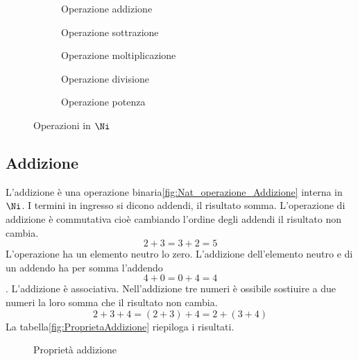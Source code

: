 \begin{figure} 
\begin{subfigure}[b]{.5\linewidth}
		\centering

	\caption{Operazione addizione}
	\label{fig:Nat_operazione_Addizione}
\end{subfigure}%
\begin{subfigure}[b]{.5\linewidth}
	\centering

	\caption{Operazione sottrazione}
	\label{fig:Nat_operazione_Sottrazione}
\end{subfigure}
	\begin{subfigure}[b]{.5\linewidth}
	\centering

	\caption{Operazione moltiplicazione}
	\label{fig:Nat_operazione_Moltiplicazione}
	\end{subfigure}
	\begin{subfigure}[b]{.5\linewidth}
	\centering

	\caption{Operazione divisione}
	\label{fig:Nat_operazione_Divisione}
	\end{subfigure}
		\begin{subfigure}[b]{.5\linewidth}
		\centering
	
		\caption{Operazione potenza}
		\label{fig:Nat_operazione_Potenza}
		\end{subfigure}
	\caption{Operazioni in $\Ni$}
	\label{fig:OperazioniinN}
\end{figure}
\subsection{Addizione}
\label{sec:NumerinatADD}
L'addizione è una operazione binaria\nobs\vref{fig:Nat_operazione_Addizione}  interna in $\Ni$. I termini in ingresso si dicono addendi, il risultato somma. L'operazione di  addizione è commutativa cioè cambiando l'ordine degli addendi il risultato non cambia. \[2+3=3+2=5\] L'operazione ha un elemento neutro lo zero. L'addizione dell'elemento neutro e di un addendo ha per somma l'addendo  \[4+0=0+4=4\]. L'addizione è associativa. Nell'addizione tre numeri è ossibile sostiuire a due numeri la loro somma che il risultato non  cambia.\[2+3+4=(2+3)+4=2+(3+4)\] La tabella\nobs\vref{fig:ProprietaAddizione} riepiloga i risultati.
\begin{figure} %
	\centering

	\caption{Proprietà addizione}
	\label{fig:ProprietaAddizione}\end{figure}
